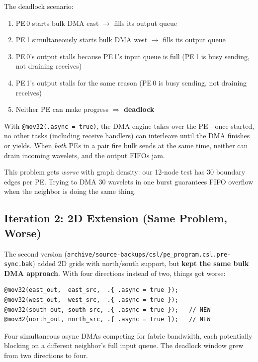 \documentclass[11pt,letterpaper]{article}
\begin{document}
The deadlock scenario:
\begin{enumerate}[nosep]
  \item PE\,0 starts bulk DMA east $\to$ fills its output queue
  \item PE\,1 simultaneously starts bulk DMA west $\to$ fills its output queue
  \item PE\,0's output stalls because PE\,1's input queue is full (PE\,1 is busy sending, not draining receives)
  \item PE\,1's output stalls for the same reason (PE\,0 is busy sending, not draining receives)
  \item Neither PE can make progress $\Longrightarrow$ \textbf{deadlock}
\end{enumerate}

With \texttt{@mov32(.async = true)}, the DMA engine takes over the PE---once started, no other tasks (including receive handlers) can interleave until the DMA finishes or yields. When \emph{both} PEs in a pair fire bulk sends at the same time, neither can drain incoming wavelets, and the output FIFOs jam.

This problem gets \emph{worse} with graph density: our 12-node test has 30 boundary edges per PE. Trying to DMA 30 wavelets in one burst guarantees FIFO overflow when the neighbor is doing the same thing.

\subsection{Iteration 2: 2D Extension (Same Problem, Worse)}

The second version (\texttt{archive/source-backups/csl/pe\_program.csl.pre-sync.bak}) added 2D grids with north/south support, but \textbf{kept the same bulk DMA approach}. With four directions instead of two, things got worse:

\begin{lstlisting}[language=CSL, numbers=none, caption={Pre-sync 2D version: still bulk DMA per direction}]
@mov32(east_out,  east_src,  .{ .async = true });
@mov32(west_out,  west_src,  .{ .async = true });
@mov32(south_out, south_src, .{ .async = true });   // NEW
@mov32(north_out, north_src, .{ .async = true });   // NEW
\end{lstlisting}

Four simultaneous async DMAs competing for fabric bandwidth, each potentially blocking on a different neighbor's full input queue. The deadlock window grew from two directions to four.
\end{document}
